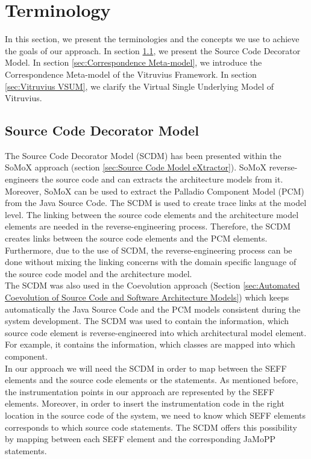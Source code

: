 \section{Terminology}
\label{sec:Terminology}
In this section, we present the terminologies and the concepts we use to achieve the goals of our approach. In section \ref{sec:Source Code Decorator Model}, we present the Source Code Decorator Model. In section \ref{sec:Correspondence Meta-model}, we introduce the Correspondence Meta-model of the Vitruvius Framework. In section \ref{sec:Vitruvius VSUM}, we clarify the Virtual Single Underlying Model of Vitruvius. 

\subsection{Source Code Decorator Model}
\label{sec:Source Code Decorator Model}

The Source Code Decorator Model (SCDM) has been presented within the SoMoX approach (section \ref{sec:Source Code Model eXtractor}).  SoMoX reverse-engineers the source code and can extracts the architecture models from it. Moreover, SoMoX can be used to extract the Palladio Component Model (PCM) from the Java Source Code. The SCDM is used to create trace links at the model level. The linking between the source code elements and the architecture model elements are needed in the reverse-engineering process. Therefore, the SCDM creates links between the source code elements and the PCM elements. Furthermore, due to the use of SCDM, the reverse-engineering process can be done without mixing the linking concerns with the domain specific language of the source code model and the architecture model.\\

The SCDM was also used in the Coevolution approach (Section \ref{sec:Automated Coevolution of Source Code and Software Architecture Models}) which keeps automatically the Java Source Code and the PCM models consistent during the system development. The SCDM was used to contain the information, which source code element is reverse-engineered into which architectural model element. For example, it contains the information, which classes are mapped into which component.\\

In our approach we will need the SCDM in order to map between the SEFF elements and the source code elements or the statements. As mentioned before, the instrumentation points in our approach are represented by the SEFF elements. Moreover, in order to insert the instrumentation code in the right location in the source code of the system, we need to know which SEFF elements corresponds to which source code statements. The SCDM offers this possibility by mapping between each SEFF element and the corresponding JaMoPP statements. \\

